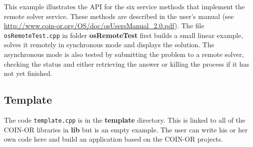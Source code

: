 \documentclass[11pt]{article}
\renewcommand{\{}{{\char"7B}}
\renewcommand{\}}{{\char"7D}}
\renewcommand{\^}{{\char"0D}}
\renewcommand{\'}{{\char"0D}}
\begin{document}
This example illustrates the API for the six service methods that implement the remote solver service.
These methods are described in the user's manual
(see \url{http://www.coin-or.org/OS/doc/osUsersManual_2.0.pdf}).
The file {\tt osRemoteTest.cpp} in folder {\bf osRemoteTest} first builds a small linear
example, solves it remotely in synchronous mode and displays the solution.
The asynchronous mode is also tested by submitting the problem to a remote solver,
checking the status and either retrieving the answer or killing the process if it has not
yet finished.

\subsection{Template}\label{section:exampleTemplate} 
The code {\tt template.cpp} is in the {\bf template} directory.  This is linked to all of the 
COIN-OR libraries in {\bf lib} but is an empty example.  The user can write his or her own code 
here and build an application based on the COIN-OR projects. 
\end{document}
